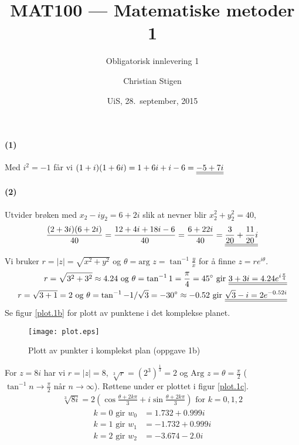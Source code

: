 \documentclass[a4paper,norsk,12pt]{article}
\title{MAT100 --- Matematiske metoder 1}
\subtitle{Obligatorisk innlevering 1}
\author{Christian Stigen}
\date{UiS, 28.~september, 2015}
\begin{document}
\maketitle


\paragraph{(1)}
Med $i^2 = -1$ får vi
\begin{math}
  (1+i)(1+6i) = 1+6i+i-6 = {\underline{\underline{-5+7i}}}
\end{math}

\paragraph{(2)}
Utvider brøken med $x_2 - iy_2 = 6 + 2i$ slik at nevner blir $x_2^2 +
y_2^2 = 40$,
\begin{equation*}
  \frac{(2+3i)(6+2i)}{40} = \frac{12+4i+18i-6}{40}
  = \frac{6+22i}{40} = {\underline{\underline{\frac{3}{20} + \frac{11}{20}i}}}
\end{equation*}


Vi bruker $r = |z| = \sqrt{x^2+y^2}$ og $\theta = \text{arg } z =
\tan^{-1}\frac{y}{x}$ for å finne $z = re^{i\theta}$.
\begin{equation*}
\begin{split}
  r = \sqrt{3^2+3^2} \approx 4.24 \text{ og } \theta = \tan^{-1}{1} =
  \frac{\pi}{4} = 45^\circ \text{ gir } {\underline{\underline{3+3i = 4.24 e^{i\frac{\pi}{4}}}}}
  \\
  r=\sqrt{3+1}=2 \text{ og } \theta = \tan^{-1}{-1/\sqrt{3}} = -30^\circ \approx -0.52
  \text{ gir }
  {\underline{\underline{\sqrt{3}-i = 2e^{-0.52i}}}}
\end{split}
\end{equation*}
%
Se figur \vref{plot.1b} for plott av punktene i det komplekse planet.

\begin{figure}
\centering
\texttt{[image: plot.eps]}
\caption{Plott av punkter i komplekst plan (oppgave 1b)}
\label{plot.1b}
\end{figure}

For $z=8i$ har vi $r = |z| = 8$, $\sqrt[3]{r} = (2^3)^\frac{1}{3} = 2$ og
$\text{Arg }z = \theta = \frac{\pi}{2}$ ($\tan^{-1}{n} \to \frac{\pi}{2} \text{ når } n \to
\infty$). Røttene under er plottet i figur \vref{plot.1c}.
%
\begin{equation*}
\begin{split}
  \sqrt[3]{8i} = 2\left( \cos{\frac{\theta+2k\pi}{3}} +
  i\sin{\frac{\theta+2k\pi}{3}} \right) \text{ for } k = 0, 1, 2
\end{split}
\end{equation*}
%
\begin{equation*}
\begin{split}
  k = 0 \text{ gir } w_0 & = 1.732 + 0.999i \\
  k = 1 \text{ gir } w_1 & = -1.732 + 0.999i \\
  k = 2 \text{ gir } w_2 & = -3.674 - 2.0i \\
\end{split}
\end{equation*}
\end{document}
